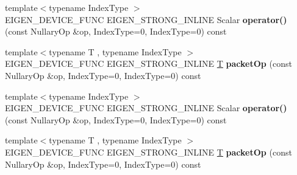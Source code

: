 \begin{DoxyCompactItemize}
\item 
\mbox{\label{struct_eigen_1_1internal_1_1nullary__wrapper_3_01_scalar_00_01_nullary_op_00_01true_00_01false_00_01false_01_4_a1aa41a9714f615a7539fd62dbbbfc903}} 
{\footnotesize template$<$typename Index\+Type $>$ }\\E\+I\+G\+E\+N\+\_\+\+D\+E\+V\+I\+C\+E\+\_\+\+F\+U\+NC E\+I\+G\+E\+N\+\_\+\+S\+T\+R\+O\+N\+G\+\_\+\+I\+N\+L\+I\+NE Scalar {\bfseries operator()} (const Nullary\+Op \&op, Index\+Type=0, Index\+Type=0) const
\item 
\mbox{\label{struct_eigen_1_1internal_1_1nullary__wrapper_3_01_scalar_00_01_nullary_op_00_01true_00_01false_00_01false_01_4_abf1d6fb5e02647e78dcdc8ea3ea0bc42}} 
{\footnotesize template$<$typename T , typename Index\+Type $>$ }\\E\+I\+G\+E\+N\+\_\+\+D\+E\+V\+I\+C\+E\+\_\+\+F\+U\+NC E\+I\+G\+E\+N\+\_\+\+S\+T\+R\+O\+N\+G\+\_\+\+I\+N\+L\+I\+NE \hyperlink{group___sparse_core___module}{T} {\bfseries packet\+Op} (const Nullary\+Op \&op, Index\+Type=0, Index\+Type=0) const
\item 
\mbox{\label{struct_eigen_1_1internal_1_1nullary__wrapper_3_01_scalar_00_01_nullary_op_00_01true_00_01false_00_01false_01_4_a1aa41a9714f615a7539fd62dbbbfc903}} 
{\footnotesize template$<$typename Index\+Type $>$ }\\E\+I\+G\+E\+N\+\_\+\+D\+E\+V\+I\+C\+E\+\_\+\+F\+U\+NC E\+I\+G\+E\+N\+\_\+\+S\+T\+R\+O\+N\+G\+\_\+\+I\+N\+L\+I\+NE Scalar {\bfseries operator()} (const Nullary\+Op \&op, Index\+Type=0, Index\+Type=0) const
\item 
\mbox{\label{struct_eigen_1_1internal_1_1nullary__wrapper_3_01_scalar_00_01_nullary_op_00_01true_00_01false_00_01false_01_4_abf1d6fb5e02647e78dcdc8ea3ea0bc42}} 
{\footnotesize template$<$typename T , typename Index\+Type $>$ }\\E\+I\+G\+E\+N\+\_\+\+D\+E\+V\+I\+C\+E\+\_\+\+F\+U\+NC E\+I\+G\+E\+N\+\_\+\+S\+T\+R\+O\+N\+G\+\_\+\+I\+N\+L\+I\+NE \hyperlink{group___sparse_core___module}{T} {\bfseries packet\+Op} (const Nullary\+Op \&op, Index\+Type=0, Index\+Type=0) const
\end{DoxyCompactItemize}



